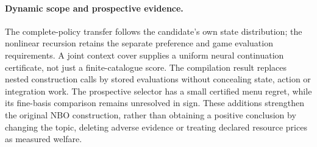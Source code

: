 \documentclass[ecta,nameyear,draft]{econsocart}
\begin{document}
\paragraph{Dynamic scope and prospective evidence.}
The complete-policy transfer follows the candidate's own state distribution; the nonlinear recursion retains the separate preference and game evaluation requirements. A joint context cover supplies a uniform neural continuation certificate, not just a finite-catalogue score. The compilation result replaces nested construction calls by stored evaluations without concealing state, action or integration work. The prospective selector has a small certified menu regret, while its fine-basis comparison remains unresolved in sign. These additions strengthen the original NBO construction, rather than obtaining a positive conclusion by changing the topic, deleting adverse evidence or treating declared resource prices as measured welfare.



\end{document}
